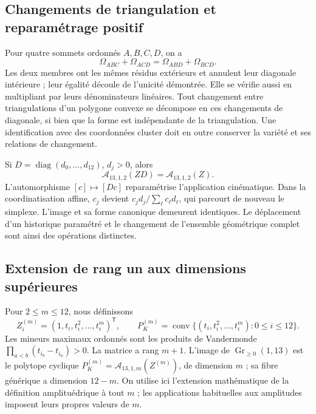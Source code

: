 \subsection{Changements de triangulation et reparamétrage positif}

Pour quatre sommets ordonnés \(A,B,C,D\), on a
\begin{equation}
 \Omega_{ABC}+\Omega_{ACD}=\Omega_{ABD}+\Omega_{BCD}.
 \label{eq:polygon-flip}
\end{equation}
Les deux membres ont les mêmes résidus extérieurs et annulent leur diagonale intérieure ; leur égalité découle de l'unicité démontrée. Elle se vérifie aussi en multipliant par leurs dénominateurs linéaires. Tout changement entre triangulations d'un polygone convexe se décompose en ces changements de diagonale, si bien que la forme est indépendante de la triangulation. Une identification avec des coordonnées cluster doit en outre conserver la variété et ses relations de changement.

Si \(D=\operatorname{diag}(d_0,\ldots,d_{12})\), \(d_j>0\), alors
\begin{equation}
 \mathcal A_{13,1,2}(ZD)=\mathcal A_{13,1,2}(Z).
 \label{eq:polygon-rescale}
\end{equation}
L'automorphisme \([c]\mapsto[Dc]\) reparamétrise l'application cinématique. Dans la coordinatisation affine, \(c_j\) devient \(c_jd_j/\sum_\ell c_\ell d_\ell\), qui parcourt de nouveau le simplexe. L'image et sa forme canonique demeurent identiques. Le déplacement d'un historique paramétré et le changement de l'ensemble géométrique complet sont ainsi des opérations distinctes.

\subsection{Extension de rang un aux dimensions supérieures}

Pour \(2\leq m\leq12\), nous définissons
\begin{equation}
 Z_i^{(m)}=(1,t_i,t_i^2,\ldots,t_i^m)^\mathsf T,\qquad
 P_K^{(m)}=\operatorname{conv}
 \{(t_i,t_i^2,\ldots,t_i^m):0\leq i\leq12\}.
 \label{eq:polygon-higher-lift}
\end{equation}
Les mineurs maximaux ordonnés sont les produits de Vandermonde
\(\prod_{a<b}(t_{i_b}-t_{i_a})>0\). La matrice a rang \(m+1\).
L’image de \(\operatorname{Gr}_{\geq0}(1,13)\) est le polytope cyclique
\(P_K^{(m)}=\mathcal A_{13,1,m}(Z^{(m)})\), de dimension \(m\) ; sa fibre
générique a dimension \(12-m\). On utilise ici l’extension mathématique
de la définition amplituédrique à tout \(m\) ; les applications
habituelles aux amplitudes imposent leurs propres valeurs de \(m\).

